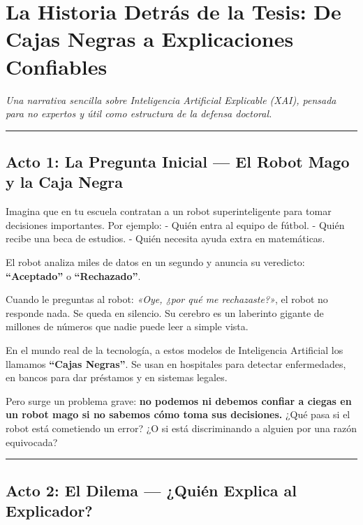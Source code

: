 \documentclass[
]{article}
\author{}
\date{}
\begin{document}
\section{La Historia Detrás de la Tesis: De Cajas Negras a Explicaciones
Confiables}\label{la-historia-detruxe1s-de-la-tesis-de-cajas-negras-a-explicaciones-confiables}

\emph{Una narrativa sencilla sobre Inteligencia Artificial Explicable
(XAI), pensada para no expertos y útil como estructura de la defensa
doctoral.}

\begin{center}\rule{0.5\linewidth}{0.5pt}\end{center}

\subsection{Acto 1: La Pregunta Inicial --- El Robot Mago y la Caja
Negra}\label{acto-1-la-pregunta-inicial-el-robot-mago-y-la-caja-negra}

Imagina que en tu escuela contratan a un robot superinteligente para
tomar decisiones importantes. Por ejemplo: - Quién entra al equipo de
fútbol. - Quién recibe una beca de estudios. - Quién necesita ayuda
extra en matemáticas.

El robot analiza miles de datos en un segundo y anuncia su veredicto:
\textbf{``Aceptado''} o \textbf{``Rechazado''}.

Cuando le preguntas al robot: \emph{«Oye, ¿por qué me rechazaste?»}, el
robot no responde nada. Se queda en silencio. Su cerebro es un laberinto
gigante de millones de números que nadie puede leer a simple vista.

En el mundo real de la tecnología, a estos modelos de Inteligencia
Artificial los llamamos \textbf{``Cajas Negras''}. Se usan en hospitales
para detectar enfermedades, en bancos para dar préstamos y en sistemas
legales.

Pero surge un problema grave: \textbf{no podemos ni debemos confiar a
ciegas en un robot mago si no sabemos cómo toma sus decisiones.} ¿Qué
pasa si el robot está cometiendo un error? ¿O si está discriminando a
alguien por una razón equivocada?

\begin{center}\rule{0.5\linewidth}{0.5pt}\end{center}

\subsection{Acto 2: El Dilema --- ¿Quién Explica al
Explicador?}\label{acto-2-el-dilema-quiuxe9n-explica-al-explicador}
\end{document}
